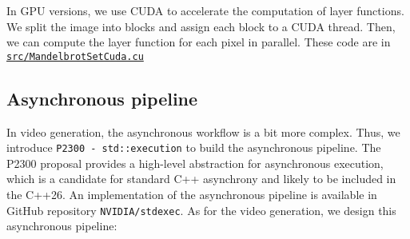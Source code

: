 \documentclass[11pt]{article}
\begin{document}
    In GPU versions, we use CUDA to accelerate the computation of layer functions.
    We split the image into blocks and assign each block to a CUDA thread.
    Then, we can compute the layer function for each pixel in parallel.
    These code are in \href{https://github.com/AI1379/MandelbrotSet/blob/master/src/MandelbrotSetCuda.cu}
    {\texttt{src/MandelbrotSetCuda.cu}}

    \subsection{Asynchronous pipeline}\label{subsec:asynchronous-pipeline}

    In video generation, the asynchronous workflow is a bit more complex.
    Thus, we introduce \texttt{P2300 - std::execution}\textsuperscript{\cite{P2300Proposal}}
    to build the asynchronous pipeline.
    The P2300 proposal provides a high-level abstraction for asynchronous execution, which is a candidate for standard
    C++ asynchrony and likely to be included in the C++26.
    An implementation of the asynchronous pipeline is available in GitHub repository
    \texttt{NVIDIA/stdexec}\textsuperscript{\cite{stdexec}}.
    As for the video generation, we design this asynchronous pipeline:

    \vspace{0.5cm}
\end{document}
